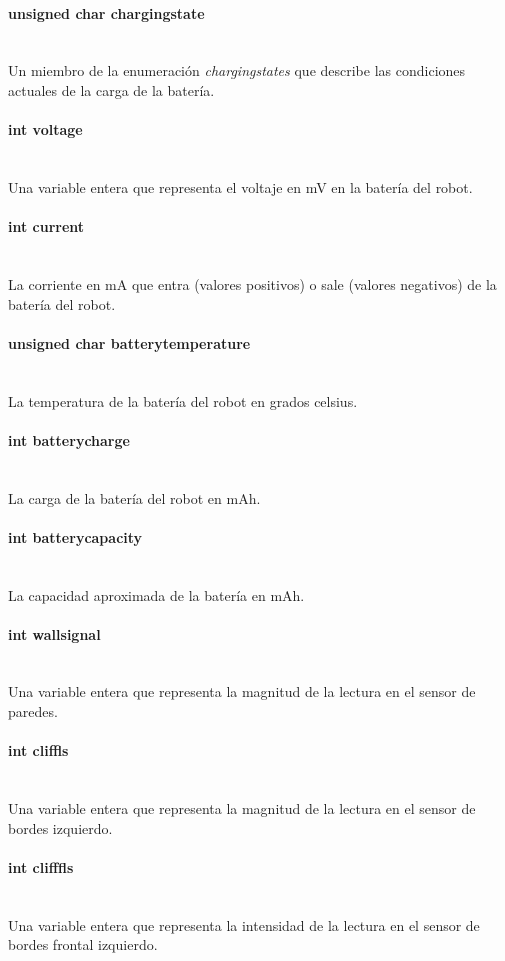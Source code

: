 \documentclass[letterpaper,openright,12pt]{book}
\begin{document}
\paragraph{unsigned char chargingstate}\mbox{}\\
Un miembro de la enumeración \emph{chargingstates} que describe las condiciones actuales de la carga de la batería.
\paragraph{int voltage}\mbox{}\\
Una variable entera que representa el voltaje en mV en la batería del robot.
\paragraph{int current}\mbox{}\\
La corriente en mA que entra (valores positivos) o sale (valores negativos) de la batería del robot. 
\paragraph{unsigned char batterytemperature}\mbox{}\\
La temperatura de la batería del robot en grados celsius.
\paragraph{int batterycharge}\mbox{}\\
La carga de la batería del robot en mAh.
\paragraph{int batterycapacity}\mbox{}\\
La capacidad aproximada de la batería en mAh.
\paragraph{int wallsignal}\mbox{}\\
Una variable entera que representa la magnitud de la lectura en el sensor de paredes.
\paragraph{int cliffls}\mbox{}\\
Una variable entera que representa la magnitud de la lectura en el sensor de bordes  izquierdo.
\paragraph{int clifffls}\mbox{}\\
Una variable entera que representa la intensidad de la lectura en el sensor de bordes frontal izquierdo.
\end{document}
